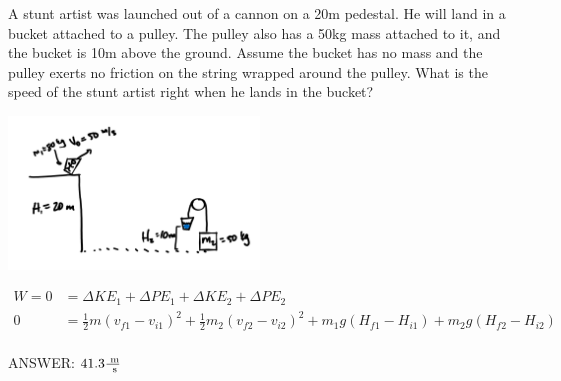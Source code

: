 \begin{problem}
    A stunt artist was launched out of a cannon on a 20m pedestal. He will land in a bucket attached to a pulley. The pulley also has a 50kg mass attached to it, and the bucket is 10m above the ground. Assume the bucket has no mass and the pulley exerts no friction on the string wrapped around the pulley. What is the speed of the stunt artist right when he lands in the bucket? 
    
    \begin{center}
        \includegraphics[width=0.5\textwidth]{chapters/ch4/images/fig4_7.PNG}
    \end{center}

    $$
    \begin{aligned}
        W = 0 &= \Delta KE_1 + \Delta PE_1 + \Delta KE_2 + \Delta PE_2\\
        0 &= \frac{1}{2}m(v_{f1}-v_{i1})^2 + \frac{1}{2}m_2(v_{f2}-v_{i2})^2 + m_1g(H_{f1} - H_{i1}) + m_2g(H_{f2} - H_{i2})\\
    \end{aligned}
    $$

    ANSWER: $41.3 \frac{\text{ m}}{\text{ s}}$
\end{problem}